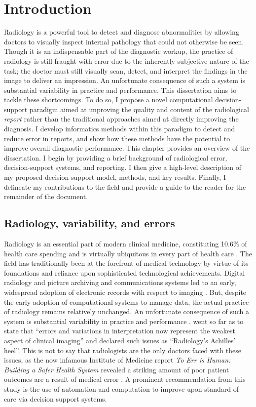 \chapter{Introduction}
Radiology is a powerful tool to detect and diagnose abnormalities by allowing doctors to visually inspect internal pathology that could not otherwise be seen. Though it is an indispensable part of the diagnostic workup, the practice of radiology is still fraught with error due to the inherently subjective nature of the task; the doctor must still visually scan, detect, and interpret the findings in the image to deliver an impression. An unfortunate consequence of such a system is substantial variability in practice and performance. This dissertation aims to tackle these shortcomings. To do so, I propose a novel computational decision-support paradigm aimed at improving the quality and content of the radiological \emph{report} rather than the traditional approaches aimed at directly improving the diagnosis. I develop informatics methods within this paradigm to detect and reduce error in reports, and show how these methods have the potential to improve overall diagnostic performance. This chapter provides an overview of the dissertation. I begin by providing a brief background of radiological error, decision-support systems, and reporting. I then give a high-level description of my proposed decision-support model, methods, and key results. Finally, I delineate my contributions to the field and provide a guide to the reader for the remainder of the document.

\section{Radiology, variability, and errors}
Radiology is an essential part of modern clinical medicine, constituting 10.6\% of health care spending and is virtually ubiquitous in every part of health care \cite{Dodoo:tg}. The field has traditionally been at the forefront of medical technology by virtue of its foundations and reliance upon sophisticated technological achievements. Digital radiology and picture archiving and communications systems led to an early, widespread adoption of electronic records with respect to imaging \cite{Strickland:2000cv,Bryan:1999kn}. But, despite the early adoption of computational systems to manage data, the actual practice of radiology remains relatively unchanged. An unfortunate consequence of such a system is substantial variability in practice and performance \cite{Fitzgerald:2001hn}.  went so far as to state that ``errors and variations in interpretation now represent the weakest aspect of clinical imaging'' and declared such issues as ``Radiology's Achilles' heel''. This is not to say that radiologists are the only doctors faced with these issues, as the now infamous Institute of Medicine report \emph{To Err is Human: Building a Safer Health System} revealed a striking amount of poor patient outcomes are a result of medical error \cite{Anonymous:2000va}. A prominent recommendation from this study is the use of automation and computation to improve upon standard of care via decision support systems.


